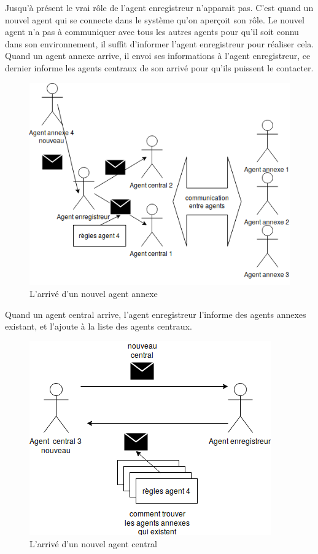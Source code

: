 \newpage
Jusqu’à présent le vrai rôle de l’agent enregistreur n’apparait pas. C’est quand un nouvel agent qui se connecte dans le système qu’on aperçoit son rôle. Le nouvel agent n’a pas à communiquer avec tous les autres agents pour qu’il soit connu dans son environnement, il suffit d’informer l’agent enregistreur pour réaliser cela. Quand un agent annexe arrive, il envoi ses informations à l’agent enregistreur, ce dernier informe les agents centraux de son arrivé pour qu’ils puissent le contacter.
\begin{figure}[H]
	\centering
	\includegraphics[scale=0.6]{imgs/newAnnexe.png}
	\caption{L'arrivé d'un nouvel agent annexe}
	\label{fig:newAnnexe}
\end{figure}
Quand un agent central arrive, l’agent enregistreur l’informe des agents annexes existant, et l’ajoute à la liste des agents centraux.
\begin{figure}[H]
	\centering
	\includegraphics[scale=0.6]{imgs/newCentral.png}
	\caption{L'arrivé d'un nouvel agent central}
	\label{fig:newCentral}
\end{figure}
\newpage
